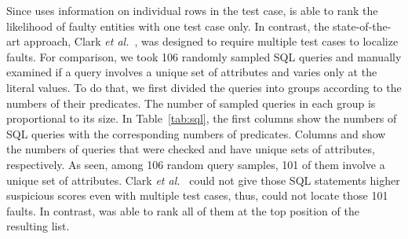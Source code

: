 \vspace{0.05in}
Since \tool{} uses information on individual rows in the test case,
\tool{} is able to rank the likelihood of faulty entities with one
test case only. In contrast, the state-of-the-art approach, Clark {\em
et al.}~\cite{ga-ase11}, was designed to require multiple test cases
to localize faults. For comparison, we took 106 randomly sampled SQL
queries and manually examined if a query involves a unique set of
attributes and varies only at the literal values. To do that, we first
divided the queries into groups according to the numbers of their
predicates. The number of sampled queries in each group is
proportional to its size. In Table~\ref{tab:sql}, the first columns
show the numbers of SQL queries with the corresponding numbers of
predicates. Columns  and  show the numbers
of queries that were checked and have unique sets of attributes,
respectively. As seen, among 106 random query samples, 101 of them
involve a unique set of attributes. Clark {\em et al.}~\cite{ga-ase11}
could not give those SQL statements higher suspicious scores even with
multiple test cases, thus, could not locate those 101 faults. In
contrast, {\tool} was able to rank all of them at the top position
of the resulting list.
